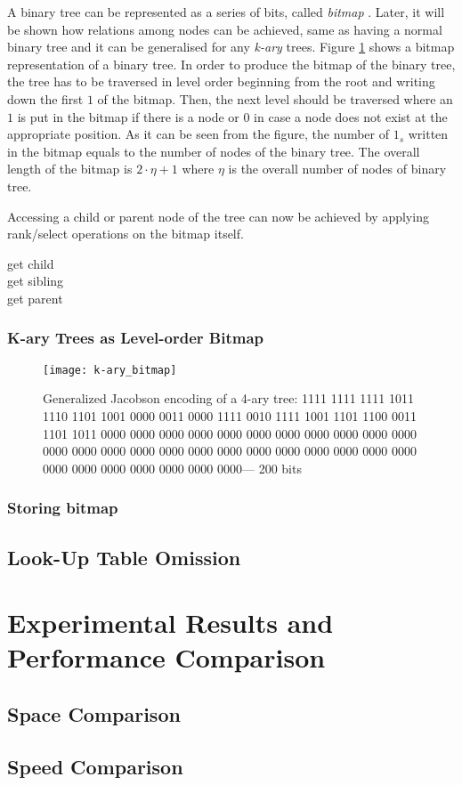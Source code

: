 A binary tree can be represented as a series of bits, called \emph{bitmap} \cite{jacobson_space-efficient_1989} . Later, it will be shown how relations among nodes can be achieved, same as having a normal binary tree and it can be generalised for any \emph{k-ary} trees. Figure \ref{fig:binary_bm} shows a bitmap representation of a binary tree. In order to produce the bitmap of the binary tree, the tree has to be traversed in level order beginning from the root and writing down the first $1$ of the bitmap. Then, the next level should be traversed where an $1$ is put in the bitmap if there is a node or $0$ in case a node does not exist at the appropriate position. As it can be seen from the figure, the number of $1_s$ written in the bitmap equals to the number of nodes of the binary tree. The overall length of the bitmap is $2 \cdot \eta  + 1$ where $\eta$ is the overall number of nodes of binary tree.
\par Accessing a child or parent node of the tree can now be achieved by applying rank/select operations on the bitmap itself.
\begin{description}
	\item [get child]
	\item [get sibling]
	\item [get parent]
\end{description}

\subsubsection{K-ary Trees as Level-order Bitmap}

\begin{figure}
	 \centering
    \texttt{[image: k-ary\_bitmap]}
    \caption{Generalized Jacobson encoding of a 4-ary tree: 1111 1111 1111 1011 1110 1101 1001 0000 0011 0000 1111 0010 1111 1001 1101 1100 0011 1101 1011 0000 0000 0000 0000 0000 0000 0000 0000 0000 0000 0000 0000 0000 0000 0000 0000 0000 0000 0000 0000 0000 0000 0000 0000 0000 0000 0000 0000 0000 0000 0000--- 200 bits}
    \label{fig:binary_bm}
\end{figure}

\subsubsection{Storing bitmap}





\subsection{Look-Up Table Omission}
\section{Experimental Results and Performance Comparison} \label{experimental}
\subsection{Space Comparison}
\subsection{Speed Comparison}



\newpage
